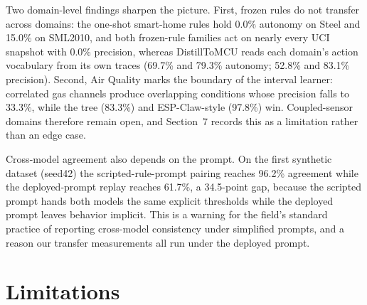 \documentclass[review]{elsarticle}
\begin{document}
Two domain-level findings sharpen the picture. First, frozen rules do not
transfer across domains: the one-shot smart-home rules hold 0.0\% autonomy on
Steel and 15.0\% on SML2010, and both frozen-rule families act on nearly
every UCI snapshot with 0.0\% precision, whereas DistillToMCU reads each
domain's action vocabulary from its own traces (69.7\% and 79.3\% autonomy;
52.8\% and 83.1\% precision). Second, Air Quality marks the boundary of the
interval learner: correlated gas channels produce overlapping conditions
whose precision falls to 33.3\%, while the tree (83.3\%) and ESP-Claw-style
(97.8\%) win. Coupled-sensor domains therefore remain open, and Section~7
records this as a limitation rather than an edge case.

Cross-model agreement also depends on the prompt. On the first synthetic
dataset (seed42) the scripted-rule-prompt pairing reaches
96.2\% agreement while the deployed-prompt replay reaches 61.7\%, a 34.5-point
gap, because the scripted prompt hands both models the same explicit
thresholds while the deployed prompt leaves behavior implicit. This is a
warning for the field's standard practice of reporting cross-model
consistency under simplified prompts, and a reason our transfer measurements
all run under the deployed prompt.

\section{Limitations}
\end{document}
